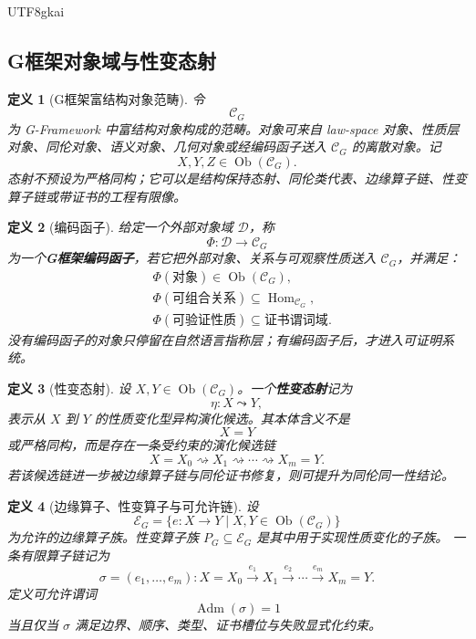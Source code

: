 \documentclass[12pt]{article}
\newtheorem{definition}{定义}[section]
\newcommand{\Cat}{\mathcal{C}}
\newcommand{\GFramework}{\textsf{G-Framework}}
\newcommand{\Adm}{\operatorname{Adm}}
\newcommand{\Hom}{\operatorname{Hom}}
\begin{document}
\begin{CJK*}{UTF8}{gkai}
\subsection{G框架对象域与性变态射}
\label{subsec:tex50-object-domain}

\begin{definition}[G框架富结构对象范畴]
令
\[
  \Cat_G
\]
为 \GFramework{} 中富结构对象构成的范畴。对象可来自 law-space 对象、性质层对象、同伦对象、语义对象、几何对象或经编码函子送入
$\Cat_G$ 的离散对象。记
\[
  X,Y,Z\in\operatorname{Ob}(\Cat_G).
\]
态射不预设为严格同构；它可以是结构保持态射、同伦类代表、边缘算子链、性变算子链或带证书的工程有限像。
\end{definition}

\begin{definition}[编码函子]
给定一个外部对象域 $\mathcal D$，称
\[
  \Phi:\mathcal D\to\Cat_G
\]
为一个\textbf{G框架编码函子}，若它把外部对象、关系与可观察性质送入 $\Cat_G$，并满足：
\[
\begin{aligned}
  &\Phi(\text{对象})\in\operatorname{Ob}(\Cat_G),\\
  &\Phi(\text{可组合关系})\subseteq\Hom_{\Cat_G},\\
  &\Phi(\text{可验证性质})\subseteq\text{证书谓词域}.
\end{aligned}
\]
没有编码函子的对象只停留在自然语言指称层；有编码函子后，才进入可证明系统。
\end{definition}

\begin{definition}[性变态射]
\label{def:tex50-property-morphism}
设 $X,Y\in\operatorname{Ob}(\Cat_G)$。一个\textbf{性变态射}记为
\[
  \eta:X\leadsto Y,
\]
表示从 $X$ 到 $Y$ 的性质变化型异构演化候选。其本体含义不是
\[
  X=Y
\]
或严格同构，而是存在一条受约束的演化候选链
\[
  X=X_0
  \rightsquigarrow X_1
  \rightsquigarrow\cdots
  \rightsquigarrow X_m=Y.
\]
若该候选链进一步被边缘算子链与同伦证书修复，则可提升为同伦同一性结论。
\end{definition}

\begin{definition}[边缘算子、性变算子与可允许链]
\label{def:tex50-edge-chain}
设
\[
  \mathcal E_G=\{e:X\to Y\mid X,Y\in\operatorname{Ob}(\Cat_G)\}
\]
为允许的边缘算子族。性变算子族 $P_G\subseteq\mathcal E_G$ 是其中用于实现性质变化的子族。
一条有限算子链记为
\[
  \sigma=(e_1,\dots,e_m):
  X=X_0\xrightarrow{e_1}X_1\xrightarrow{e_2}\cdots\xrightarrow{e_m}X_m=Y.
\]
定义可允许谓词
\[
  \Adm(\sigma)=1
\]
当且仅当 $\sigma$ 满足边界、顺序、类型、证书槽位与失败显式化约束。
\end{definition}


\end{CJK*}
\end{document}

